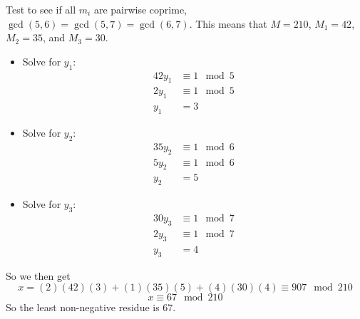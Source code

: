 \documentclass[class=article, crop=false]{standalone}
\begin{document}
\subsubsection{}
Test to see if all $m_i$ are pairwise coprime, $\gcd(5,6)=\gcd(5,7)=\gcd(6,7)$. This means that
	$M=210$, $M_1=42$, $M_2=35$, and $M_3=30$.
	\begin{itemize}
		\item[] Solve for $y_1$:
			\begin{align*}
				42y_1 &\equiv 1\mod 5 \\
				2y_1 &\equiv 1\mod 5 \\
				y_1 &= 3
			\end{align*}
		
		\item[] Solve for $y_2$:
			\begin{align*}
				35y_2 &\equiv 1\mod 6 \\
				5y_2 &\equiv 1\mod 6 \\
				y_2 &= 5
			\end{align*}
		
		\item[] Solve for $y_3$:
			\begin{align*}
				30y_3 &\equiv 1\mod 7 \\
				2y_3 &\equiv 1\mod 7 \\
				y_3 &= 4
			\end{align*}
	\end{itemize}
	So we then get
	$$x = (2)(42)(3) + (1)(35)(5) + (4)(30)(4) \equiv 907\mod 210$$
	$$x\equiv 67\mod 210$$
	So the least non-negative residue is $67$.
\end{document}
